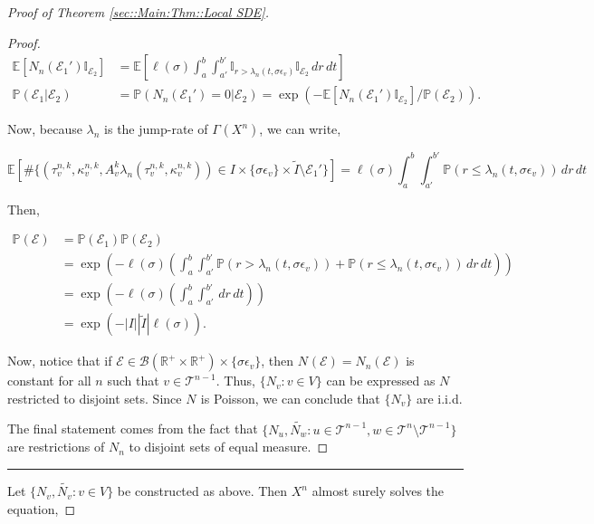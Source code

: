 \documentclass[12pt]{article}
\newcommand{\mb}{\mathbb}
\newcommand{\mc}{\mathcal}
\newcommand{\ms}{\mathscr}
\newcommand{\ep}{\epsilon}
\newcommand{\ind}{\hspace{24pt}}
\newcommand{\lin}{\rule{\linewidth}{0.4 pt}}
\newcommand{\pr}{\mb{P}}							%
\newcommand{\ex}[1]{\mb{E}\left[#1\right]}			%
\renewcommand{\v}{v}							%
\newcommand{\vv}{u}								%
\newcommand{\vvv}{w}							%
\renewcommand{\S}{S}							%
\newcommand{\s}{\sigma}							%
\newcommand{\ev}[1]{\ep_{#1}}					%
\renewcommand{\t}{t}							%
\newcommand{\poiss}[1]{N_{#1}}						%
\newcommand{\pup}[1]{^{#1}}							%
\newcommand{\tree}{\mc{T}}							%
\newcommand{\V}{V}									%
\renewcommand{\r}{r}								%
\newcommand{\rt}[1]{\tau^{#1}}						%
\renewcommand{\it}{k}								%
\newcommand{\numb}{n}								%
\newcommand{\rxvtsn}[3]{X_{#1}^{#3}{#2}}			%
\newcommand{\rate}[1]{\lambda_{#1}}					%
\newcommand{\Sm}{\ell}								%
\newcommand{\alt}{\widetilde}						%
\newcommand{\rv}{A}								%
\newcommand{\evnt}{\mc{E}}						%
\renewcommand{\mark}[1]{\kappa^{#1}}				%
\newcommand{\pmap}[1]{\Gamma_{#1}}				%
\newcommand{\inte}{I}							%
\begin{document}
\begin{proof}[Proof of Theorem \ref{sec::Main:Thm::Local SDE}]
\begin{proof}
\begin{align*}
\ex{\poiss{\numb}(\evnt_1')\mb{I}_{\evnt_2}} &= \ex{\Sm(\s)\int_a^b\int_{a'}^{b'} \mb{I}_{\r > \rate{\numb}(\t,\s\ev{\v})}\mb{I}_{\evnt_2}\,d\r\,d\t}\\
\pr(\evnt_1|\evnt_2) &= \pr\left(\poiss{\numb}(\evnt_1')= 0|\evnt_2\right) = \exp\left(-\ex{\poiss{\numb}(\evnt_1')\mb{I}_{\evnt_2}}/\pr(\evnt_2)\right).
\end{align*}

Now, because \(\rate{\numb}\) is the jump-rate of \(\pmap{}(\rxvtsn{}{}{\numb})\), we can write,

\[\ex{\#\{(\rt{\numb,\it}_\v,\mark{\numb,\it}_\v,\rv_\v^\it \rate{\numb}(\rt{\numb,\it}_\v,\mark{\numb,\it}_\v)) \in \inte\times \{\s\ev{\v}\}\times\alt{\inte}\setminus \evnt_1'\}} = \Sm(\s)\int_a^b\int_{a'}^{b'} \pr\left(\r \leq \rate{\numb}(\t,\s\ev{\v})\right)\,d\r\,d\t\] 

Then,

\begin{align*}
\pr(\evnt) &=\pr(\evnt_1)\pr(\evnt_2)\\
&= \exp\left(-\Sm(\s)\left(\int_a^b\int_{a'}^{b'} \pr\left(\r > \rate{\numb}(\t,\s\ev{\v})\right) + \pr\left(\r \leq \rate{\numb}(\t,\s\ev{\v})\right)\,d\r\,d\t\right)\right)\\
&=\exp\left(-\Sm(\s)\left(\int_a^b\int_{a'}^{b'}\,d\r\,d\t\right)\right)\\
&=\exp\left(-|\inte||\alt{\inte}|\Sm(\s)\right).
\end{align*}

Now, notice that if \(\evnt \in \ms{B}(\mb{R}^+\times\mb{R}^+)\times \{\s\ev{\v}\}\), then \(\poiss{}(\evnt) = \poiss{\numb}(\evnt)\) is constant for all \(\numb\) such that \(\v \in \tree\pup{\numb-1}\). Thus, \(\{\poiss{\v}:\v \in \V\}\) can be expressed as \(\poiss{}\) restricted to disjoint sets. Since \(\poiss{}\) is Poisson, we can conclude that \(\{\poiss{\v}\}\) are i.i.d.

\ind The final statement comes from the fact that \(\{\poiss{\vv},\alt{\poiss{\vvv}}:\vv\in \tree\pup{\numb-1},\vvv\in\tree\pup{\numb}\setminus\tree\pup{\numb-1}\}\) are restrictions of \(\poiss{\numb}\) to disjoint sets of equal measure.
\end{proof}
\lin

Let \(\{\poiss{\v},\alt{\poiss{\v}}:\v\in\V\}\) be constructed as above. Then \(\rxvtsn{}{}{\numb}\) almost surely solves the equation,


\end{proof}
\end{document}

